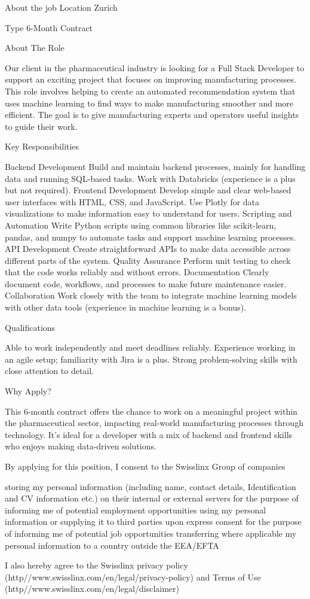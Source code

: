 About the job
Location Zurich

Type 6-Month Contract

About The Role

Our client in the pharmaceutical industry is looking for a Full Stack Developer to support an exciting project that focuses on improving manufacturing processes. This role involves helping to create an automated recommendation system that uses machine learning to find ways to make manufacturing smoother and more efficient. The goal is to give manufacturing experts and operators useful insights to guide their work.

Key Responsibilities

 Backend Development
 Build and maintain backend processes, mainly for handling data and running SQL-based tasks.
 Work with Databricks (experience is a plus but not required).
 Frontend Development
 Develop simple and clear web-based user interfaces with HTML, CSS, and JavaScript.
 Use Plotly for data visualizations to make information easy to understand for users.
 Scripting and Automation
 Write Python scripts using common libraries like scikit-learn, pandas, and numpy to automate tasks and support machine learning processes.
 API Development
 Create straightforward APIs to make data accessible across different parts of the system.
 Quality Assurance
 Perform unit testing to check that the code works reliably and without errors.
 Documentation
 Clearly document code, workflows, and processes to make future maintenance easier.
 Collaboration
 Work closely with the team to integrate machine learning models with other data tools (experience in machine learning is a bonus).

Qualifications

 Able to work independently and meet deadlines reliably.
 Experience working in an agile setup; familiarity with Jira is a plus.
 Strong problem-solving skills with close attention to detail.

Why Apply?

This 6-month contract offers the chance to work on a meaningful project within the pharmaceutical sector, impacting real-world manufacturing processes through technology. It’s ideal for a developer with a mix of backend and frontend skills who enjoys making data-driven solutions.

By applying for this position, I consent to the Swisslinx Group of companies

 storing my personal information (including name, contact details, Identification and CV information etc.) on their internal or external servers for the purpose of informing me of potential employment opportunities
 using my personal information or
 supplying it to third parties upon express consent for the purpose of informing me of potential job opportunities
 transferring where applicable my personal information to a country outside the EEA/EFTA

I also hereby agree to the Swisslinx privacy policy (http//www.swisslinx.com/en/legal/privacy-policy) and Terms of Use (http//www.swisslinx.com/en/legal/disclaimer)

